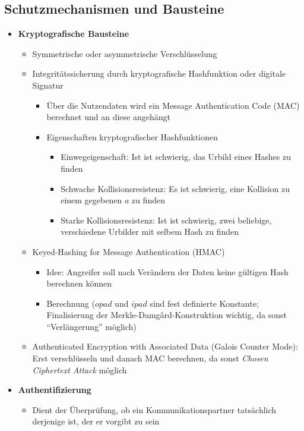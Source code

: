 \subsection{Schutzmechanismen und Bausteine}
\begin{itemize}
	\item \textbf{Kryptografische Bausteine}
	\begin{itemize}
		\item Symmetrische oder asymmetrische Verschlüsselung
		\item Integritätssicherung durch kryptografische Hashfunktion oder digitale Signatur
		\begin{itemize}
			\item Über die Nutzendaten wird ein Message Authentication Code (MAC) berechnet und an diese angehängt
			\item Eigenschaften kryptografischer Hashfunktionen
			\begin{itemize}
				\item Einwegeigenschaft: Ist ist schwierig, das Urbild eines Hashes zu finden
				\item Schwache Kollisionsresistenz: Es ist schwierig, eine Kollision zu einem gegebenen \(a\) zu finden
				\item Starke Kollisionsresistenz: Ist ist schwierig, zwei beliebige, verschiedene Urbilder mit selbem Hash zu finden
			\end{itemize}
		\end{itemize}
		\item Keyed-Hashing for Message Authentication (HMAC)
		\begin{itemize}
			\item Idee: Angreifer soll nach Verändern der Daten keine gültigen Hash berechnen können
			\item Berechnung (\(opad\) und \(ipad\) sind fest definierte Konstante; Finalisierung der Merkle-Damgârd-Konstruktion wichtig, da sonst "`Verlängerung"' möglich)
		\end{itemize}
		\item Authenticated Encryption with Associated Data (Galois Counter Mode): Erst verschlüsseln und danach MAC berechnen, da sonst \textit{Chosen Ciphertext Attack} möglich
	\end{itemize}
	\item \textbf{Authentifizierung}
	\begin{itemize}
		\item Dient der Überprüfung, ob ein Kommunikationspartner tatsächlich derjenige ist, der er vorgibt zu sein

\end{itemize}
\end{itemize}
